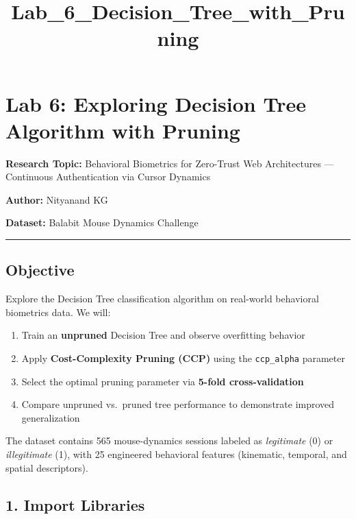 \documentclass[11pt]{article}
\title{Lab\_6\_Decision\_Tree\_with\_Pruning}
\providecommand{\tightlist}{%
      \setlength{\itemsep}{0pt}\setlength{\parskip}{0pt}}
\begin{document}
    
    \maketitle
    
    

    
    \section{Lab 6: Exploring Decision Tree Algorithm with
Pruning}\label{lab-6-exploring-decision-tree-algorithm-with-pruning}

\textbf{Research Topic:} Behavioral Biometrics for Zero-Trust Web
Architectures --- Continuous Authentication via Cursor Dynamics

\textbf{Author:} Nityanand KG

\textbf{Dataset:} Balabit Mouse Dynamics Challenge

\begin{center}\rule{0.5\linewidth}{0.5pt}\end{center}

\subsection{Objective}\label{objective}

Explore the Decision Tree classification algorithm on real-world
behavioral biometrics data. We will:

\begin{enumerate}
\def\labelenumi{\arabic{enumi}.}
\tightlist
\item
  Train an \textbf{unpruned} Decision Tree and observe overfitting
  behavior
\item
  Apply \textbf{Cost-Complexity Pruning (CCP)} using the
  \texttt{ccp\_alpha} parameter
\item
  Select the optimal pruning parameter via \textbf{5-fold
  cross-validation}
\item
  Compare unpruned vs.~pruned tree performance to demonstrate improved
  generalization
\end{enumerate}

The dataset contains 565 mouse-dynamics sessions labeled as
\emph{legitimate} (0) or \emph{illegitimate} (1), with 25 engineered
behavioral features (kinematic, temporal, and spatial descriptors).

    \subsection{1. Import Libraries}\label{import-libraries}
\end{document}
